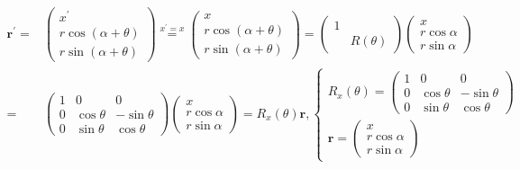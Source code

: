 \documentclass[
]{book}
\theoremstyle{definition}
\theoremstyle{definition}
\theoremstyle{definition}
\theoremstyle{definition}
\theoremstyle{remark}
\begin{document}
\[
\begin{aligned}
\boldsymbol{r}^{\prime}= & \begin{pmatrix}x^{\prime}\\
r\cos\left(\alpha+\theta\right)\\
r\sin\left(\alpha+\theta\right)
\end{pmatrix}\overset{x^{\prime}=x}{=}\begin{pmatrix}x\\
r\cos\left(\alpha+\theta\right)\\
r\sin\left(\alpha+\theta\right)
\end{pmatrix}=\begin{pmatrix}1\\
 & R\left(\theta\right)
\end{pmatrix}\begin{pmatrix}x\\
r\cos\alpha\\
r\sin\alpha
\end{pmatrix}\\
= & \begin{pmatrix}1 & 0 & 0\\
0 & \cos\theta & -\sin\theta\\
0 & \sin\theta & \cos\theta
\end{pmatrix}\begin{pmatrix}x\\
r\cos\alpha\\
r\sin\alpha
\end{pmatrix}=R_{{\scriptscriptstyle x}}\left(\theta\right)\boldsymbol{r},\begin{cases}
R_{{\scriptscriptstyle x}}\left(\theta\right)=\begin{pmatrix}1 & 0 & 0\\
0 & \cos\theta & -\sin\theta\\
0 & \sin\theta & \cos\theta
\end{pmatrix}\\
\boldsymbol{r}=\begin{pmatrix}x\\
r\cos\alpha\\
r\sin\alpha
\end{pmatrix}
\end{cases}
\end{aligned}
\]
\end{document}
